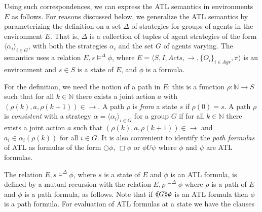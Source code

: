 \documentclass[a4wide]{article}
\newcommand{\trans}{\rightarrow}
\newcommand{\until}{U}
\newcommand{\nat}{\mathbb{N}}
\theoremstyle{examplesty}
\newcommand{\Ags}{\mathit{Ags}}
\newcommand{\atlop}[1]{\langle\hspace{-2pt}\langle #1 \rangle \hspace{-2pt}\rangle }
\newcommand{\Env}{E}
\newcommand{\Acts}{\mathit{Acts}}
\newcommand{\nxt}{\Circle}
\newcommand{\always}{\Box}
\newcommand{\sgy}{\alpha}
\begin{document}
\newcommand{\GStrats}{\Delta}  

\newcommand{\trl}[1]{#1^*} 
 \newcommand{\compl}[1]{\mathit{comp}(#1)} 


Using such correspondences, we  can express the ATL semantics in 
environments $\Env$ as follows. For reasons discussed below, we 
generalize the ATL semantics by parameterizing the definition on a set $\GStrats$ of strategies for groups of agents in the environment $\Env$.
That is, $\GStrats$ is a collection of tuples of agent strategies of the form $\langle \sgy_i\rangle_{i\in G}$, with
both the strategies $\alpha_i$ and 
 the set $G$ of agents varying. 
The semantics uses a relation 
$\Env, s\models^\GStrats \phi$, 
where $\Env =  \langle S, I, \Acts, \trans, \{O_i\}_{i\in \Ags}, \pi\rangle$ is an environment
and 
$s\in S$ is a state of $\Env$, 
and $\phi$ is a formula. 

For the definition, we need the notion of a path in $\Env$: this is a
function $\rho: \nat \rightarrow S$ such that for all $k \in \nat$ there exists a joint action $a$ with $(\rho(k), a, \rho(k+1)) \in \trans$. 
A path $\rho$ is \emph{from} a state $s$ if $\rho(0) = s$. 
A path $\rho$ is {\em consistent}  with a strategy $\sgy= \langle \alpha_i\rangle_{i\in G}$ for a group $G$ if for all   $k \in \nat$ 
there exists a joint action $a$ such that $(\rho(k), a, \rho(k+1)) \in \trans$ and  $a_i \in \sgy_i(\rho(k))$ 
for all $i \in G$. 
It is also convenient to identify the  \emph{path formulas} of ATL as formulas of the form $\nxt \phi$, $\always \phi$ or
$\phi \until \psi$ where $\phi$ and $\psi$ are ATL formulas. 


The relation $\Env,s\models^\GStrats \phi$, where $s$ is a state of $\Env$ and $\phi$ is an ATL formula, is defined
by a mutual recursion with the relation $\Env,\rho\models^\GStrats \phi$ where $\rho$ is a path of $\Env$ and $\phi$ is a path
formula, as follows. Note that if $\atlop{G} \phi$ is an ATL formula then $\phi$ is a path formula. 
For evaluation of ATL formulas at a state we have the clauses
\end{document}
